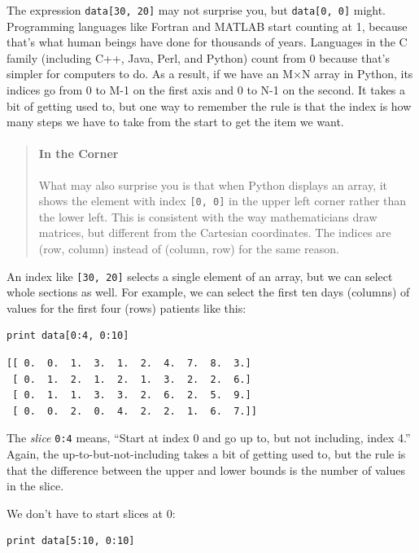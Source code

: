 \documentclass[]{book}
\newcommand{\gdef}[2]{\emph{#2}}
\begin{document}
The expression \texttt{data{[}30, 20{]}} may not surprise you, but
\texttt{data{[}0, 0{]}} might. Programming languages like Fortran and
MATLAB start counting at 1, because that's what human beings have done
for thousands of years. Languages in the C family (including C++, Java,
Perl, and Python) count from 0 because that's simpler for computers to
do. As a result, if we have an M×N array in Python, its indices go from
0 to M-1 on the first axis and 0 to N-1 on the second. It takes a bit of
getting used to, but one way to remember the rule is that the index is
how many steps we have to take from the start to get the item we want.

\begin{quote}
\mbox{}\paragraph{In the Corner}

What may also surprise you is that when Python displays an array, it
shows the element with index \texttt{{[}0, 0{]}} in the upper left
corner rather than the lower left. This is consistent with the way
mathematicians draw matrices, but different from the Cartesian
coordinates. The indices are (row, column) instead of (column, row) for
the same reason.
\end{quote}

An index like \texttt{{[}30, 20{]}} selects a single element of an
array, but we can select whole sections as well. For example, we can
select the first ten days (columns) of values for the first four (rows)
patients like this:

\begin{verbatim}
print data[0:4, 0:10]
\end{verbatim}

\begin{verbatim}
[[ 0.  0.  1.  3.  1.  2.  4.  7.  8.  3.]
 [ 0.  1.  2.  1.  2.  1.  3.  2.  2.  6.]
 [ 0.  1.  1.  3.  3.  2.  6.  2.  5.  9.]
 [ 0.  0.  2.  0.  4.  2.  2.  1.  6.  7.]]
\end{verbatim}

The \gdef{g:slice}{slice} \texttt{0:4} means, ``Start at index 0 and
go up to, but not including, index 4.'' Again, the
up-to-but-not-including takes a bit of getting used to, but the rule is
that the difference between the upper and lower bounds is the number of
values in the slice.

We don't have to start slices at 0:

\begin{verbatim}
print data[5:10, 0:10]
\end{verbatim}
\end{document}
